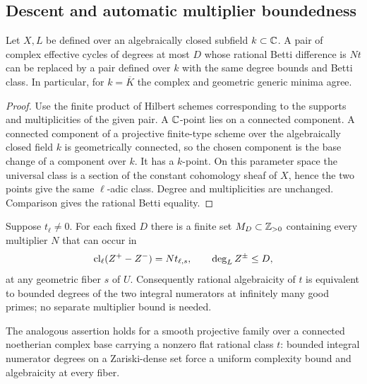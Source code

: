 \subsection{Descent and automatic multiplier boundedness}

\begin{proposition}
Let $X,L$ be defined over an algebraically closed subfield $k\subset\mathbb C$.
A pair of complex effective cycles of degrees at most $D$ whose rational
Betti difference is $Nt$ can be replaced by a pair defined over $k$ with
the same degree bounds and Betti class. In particular, for $k=\overline K$
the complex and geometric generic minima agree.
\end{proposition}

\begin{proof}
Use the finite product of Hilbert schemes corresponding to the supports
and multiplicities of the given pair. A $\mathbb C$-point lies on a connected
component. A connected component of a projective finite-type scheme over
the algebraically closed field $k$ is geometrically connected, so the
chosen component is the base change of a component over $k$. It has a
$k$-point. On this parameter space the universal class is a section of
the constant cohomology sheaf of $X$, hence the two points give the same
$\ell$-adic class. Degree and multiplicities are unchanged. Comparison
gives the rational Betti equality.
\end{proof}

\begin{proposition}
Suppose $t_\ell\ne0$. For each fixed $D$ there is a finite set
$M_D\subset\mathbb Z_{>0}$ containing every multiplier $N$ that can occur in
\[
 \operatorname{cl}_\ell(Z^+-Z^-)=Nt_{\ell,s},\qquad \deg_L Z^\pm\leq D,
\]
at any geometric fiber $s$ of $U$. Consequently rational algebraicity of
$t$ is equivalent to bounded degrees of the two integral numerators at
infinitely many good primes; no separate multiplier bound is needed.

The analogous assertion holds for a smooth projective family over a
connected noetherian complex base carrying a nonzero flat rational class
$t$: bounded integral numerator degrees on a Zariski-dense set force a
uniform complexity bound and algebraicity at every fiber.
\end{proposition}

